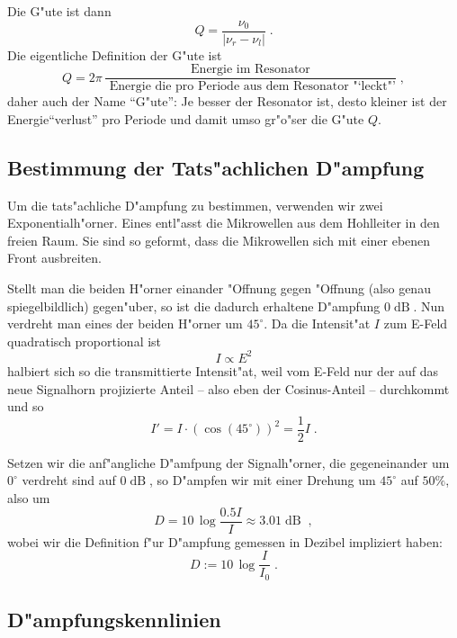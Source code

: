 \documentclass[a4paper,12pt]{article}
\begin{document}
Die G"ute ist dann
\begin{equation}
	Q = \frac{\nu_0}{| \nu_r - \nu_l |} \;.
	\label{eq:guete_def}
\end{equation}
Die eigentliche Definition der G"ute ist 
\begin{equation}
  \label{eq:4}
  Q = 2\pi \, \frac{ \text{Energie im Resonator} }{\text{ Energie die
      pro Periode aus dem Resonator "`leckt"'} } \;,
\end{equation}
daher auch der Name "`G"ute"': Je besser der Resonator ist, desto
kleiner ist der Energie"`verlust"' pro Periode und damit umso gr"o"ser
die G"ute $Q$.




\subsection{Bestimmung der Tats"achlichen D"ampfung}
\label{sec:best_der_tats_dampf}

Um die tats"achliche D"ampfung zu bestimmen, verwenden wir zwei
Exponentialh"orner. Eines entl"asst die Mikrowellen aus dem Hohlleiter
in den freien Raum. Sie sind so geformt, dass die Mikrowellen sich mit
einer ebenen Front ausbreiten.

Stellt man die beiden H"orner einander "Offnung gegen "Offnung (also
genau spiegelbildlich) gegen"uber, so ist die dadurch erhaltene
D"ampfung $0\operatorname{dB}$. Nun verdreht man eines der beiden
H"orner um $45^\circ$. Da die Intensit"at $I$ zum E-Feld quadratisch
proportional ist
$$
I \propto	E^2
$$
halbiert sich so die transmittierte Intensit"at, weil vom E-Feld nur
der auf das neue Signalhorn projizierte Anteil -- also eben der
Cosinus-Anteil -- durchkommt und so
$$
I' = I \cdot \left( \cos( 45^\circ ) \right)^2 = \frac 1 2 I \;.
$$

Setzen wir die anf"angliche D"amfpung der Signalh"orner, die
gegeneinander um $0^\circ$ verdreht sind auf $0\operatorname{dB}$, so
D"ampfen wir mit einer Drehung um $45^\circ$ auf $50\%$, also um
$$
D = 10 \, \log\frac{ 0.5 I }{ I } \approx	3.01 \operatorname{dB} \;,
$$
wobei wir die Definition f"ur D"ampfung gemessen in Dezibel impliziert
haben:
\begin{equation}
\label{eq:def_daempfung}
	D := 10 \, \log \frac{ I }{ I_0 } \;.
\end{equation}



\subsection{D"ampfungskennlinien}
\label{sec:dampfungskennlinien}
\end{document}
